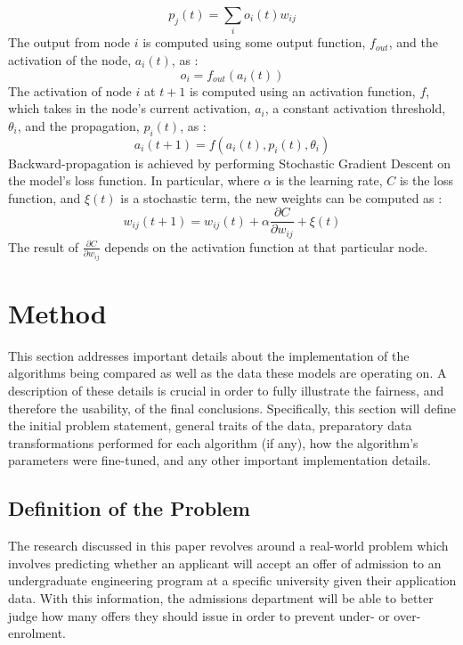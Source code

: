 \documentclass[titlepage]{article}
\begin{document}
$$p_j(t) = \sum\limits_i o_i(t)w_{ij}$$
The output from node $i$ is computed using some output function, $f_{out}$, and the activation of the node, $a_i(t)$, as \cite{AnnMath}:
$$o_i = f_{out}(a_i(t))$$
The activation of node $i$ at $t+1$ is computed using an activation function, $f$, which takes in the node's current activation, $a_i$, a constant activation threshold, $\theta_i$, and the propagation, $p_i(t)$, as \cite{AnnMath}:
$$a_i(t+1) = f(a_i(t), p_i(t), \theta_i)$$
Backward-propagation is achieved by performing Stochastic Gradient Descent on the model's loss function. In particular, where $\alpha$ is the learning rate, $C$ is the loss function, and $\xi(t)$ is a stochastic term, the new weights can be computed as \cite{AnnMath}:
$$w_{ij}(t+1) = w_{ij}(t) + \alpha\frac{\partial C}{\partial w_{ij}} + \xi(t)$$
The result of $\frac{\partial C}{\partial w_{ij}}$ depends on the activation function at that particular node.



\newpage
\section{Method}
This section addresses important details about the implementation of the algorithms being compared as well as the data these models are operating on. A description of these details is crucial in order to fully illustrate the fairness, and therefore the usability, of the final conclusions. Specifically, this section will define the initial problem statement, general traits of the data, preparatory data transformations performed for each algorithm (if any), how the algorithm's parameters were fine-tuned, and any other important implementation details.

\subsection{Definition of the Problem}
The research discussed in this paper revolves around a real-world problem which involves predicting whether an applicant will accept an offer of admission to an undergraduate engineering program at a specific university given their application data. With this information, the admissions department will be able to better judge how many offers they should issue in order to prevent under- or over-enrolment.
\end{document}
